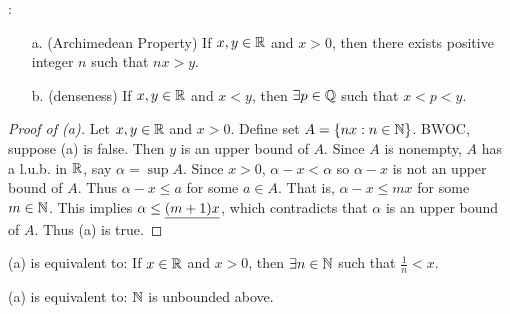 \documentclass[]{article}
\begin{document}
\begin{theorem}:
	\begin{enumerate}
		\item[a.] (Archimedean Property) If $x,y\in\mathbb{R}$ and $x>0$, then there exists positive integer $n$ such that $nx>y$.
		\item[b.] (denseness) If $x,y\in\mathbb{R}$ and $x<y$, then $\exists p\in\mathbb{Q}$ such that $x<p<y$.
	\end{enumerate}
\end{theorem}
\begin{proof}
	[Proof of (a)]
	Let $x,y\in\mathbb{R}$ and $x>0$.
	Define set $A=\left\{ nx : n\in\mathbb{N} \right\}$. BWOC, suppose (a) is false. Then $y$ is an upper bound of $A$. Since $A$ is nonempty, $A$ has a l.u.b. in $\mathbb{R}$, say $\alpha = \sup A$. Since $x>0$, $\alpha-x<\alpha$ so $\alpha-x$ is not an upper bound of $A$.
	Thus $\alpha-x\leq a$ for some $a\in A$. That is, $\alpha-x\leq mx$ for some $m\in\mathbb{N}$.
	This implies $\alpha\leq\underline{(m+1)x}$, which contradicts that $\alpha$ is an upper bound of $A$. Thus (a) is true.
\end{proof}
\begin{note}
	(a) is equivalent to: If $x\in\mathbb{R}$ and $x>0$, then $\exists n\in\mathbb{N}$ such that $\frac1n<x$.
\end{note}
\begin{note}
	(a) is equivalent to: $\mathbb{N}$ is unbounded above.
\end{note}
\end{document}
